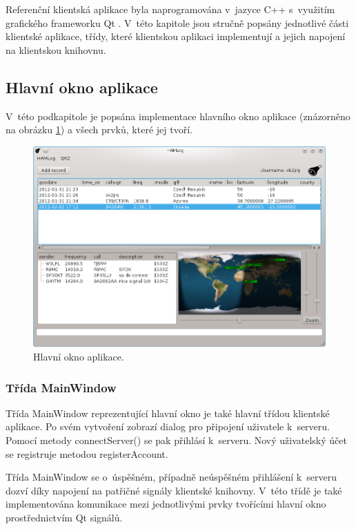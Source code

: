Referenční klientská aplikace byla naprogramována v~jazyce C++ s~využitím grafického frameworku Qt \cite{qt}. V~této kapitole jsou stručně
popsány jednotlivé části klientské aplikace, třídy, které klientskou aplikaci implementují a jejich napojení na klientskou knihovnu.

\subsection{Hlavní okno aplikace}

V~této podkapitole je popsána implementace hlavního okno aplikace (znázorněno na obrázku \ref{fig:okno}) a všech prvků, které jej tvoří.

\begin{figure}[h]
\centering
\includegraphics[trim=0cm 0cm 0cm 0cm, scale=0.7]{fig/ham3}
\caption{Hlavní okno aplikace.}
\label{fig:okno}
\end{figure}

\subsubsection{Třída MainWindow}

Třída MainWindow reprezentující hlavní okno je také hlavní třídou klientské aplikace. Po svém vytvoření zobrazí dialog
pro připojení uživatele k~serveru. Pomocí metody connectServer() se pak přihlásí
k~serveru. Nový uživatelský
účet se registruje metodou registerAccount.

Třída MainWindow se o~úspěšném, případně neúspěšném přihlášení k~serveru dozví díky napojení
na patřičné signály klientské knihovny. V~této třídě je také implementována komunikace mezi jednotlivými prvky tvořícími hlavní okno
prostřednictvím Qt signálů.


